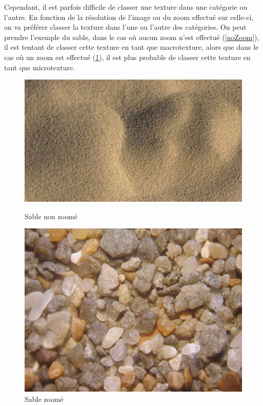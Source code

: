 Cependant, il est parfois difficile de classer une texture dans une catégorie ou l'autre. En fonction de la résolution de l'image ou du zoom effectué sur celle-ci, on va préférer classer la texture dans l'une ou l'autre des catégories. On peut prendre l'exemple du sable, dans le cas où aucun zoom n'est effectué (\ref{noZoom}), il est tentant de classer cette texture en tant que macrotexture, alors que dans le cas où un zoom est effectué (\ref{Zoom}), il est plus probable de classer cette texture en tant que microtexture.

\begin{figure}
   \begin{minipage}[c]{.46\linewidth}
	  \centering
      \includegraphics[scale=0.16]{images/sableNoZoom.jpg}
      \caption{\label{noZoom} Sable non zoomé}
   \end{minipage} \hfill
   \begin{minipage}[c]{.46\linewidth}
      \centering
      \includegraphics[scale=0.2]{images/sableZoom.jpg}
      \caption{\label{Zoom} Sable zoomé}
   \end{minipage}
\end{figure}

